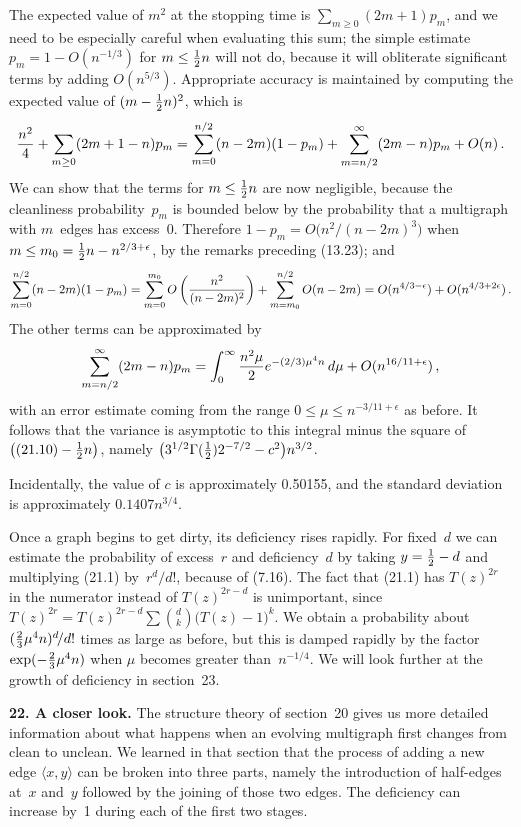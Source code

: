 The expected value of $m^2$ at the stopping time is $\sum_{m\geq
0}(2m+1)p_m$, 
and we need to be especially careful when evaluating this sum; the
simple estimate $p_m=1-O(n^{-1/3})$ for $m\leq {1\over2} n$ will not
do, because it will obliterate significant terms by adding
$O(n^{5/3})$. Appropriate accuracy is maintained by computing
the expected value of $(m-{1\over2} n)^2$, which is
$${n^2\over 4}+\sum_{m\geq
0}(2m+1-n)p_m=\sum_{m=0}^{n/2}(n-2m)(1-p_m)
+\sum_{m=n/2}^{\infty}(2m-n)p_m+O(n)\,.$$
We can show that the terms for $m\leq {1\over2} n$ are now negligible,
because the cleanliness probability~$p_m$ is bounded below by the
probability that a multigraph with $m$~edges has excess~0. Therefore
$1-p_m=O\bigl(n^2\!/(n-2m)^3\bigr)$ when $m\leq m_0={1\over
2}n-n^{2/3+\epsilon}$, by the remarks preceding (13.23); and
$$\sum_{m=0}^{n/2}(n-2m)(1-p_m)=\sum_{m=0}^{m_0}O\left({n^2\over
(n-2m)^2}\right)
+\sum_{m=m_0}^{n/2}O(n-2m)=O(n^{4/3-\epsilon})+O(n^{4/3+2\epsilon})\,.$$
The other terms can be approximated by
$$\sum_{m=n/2}^{\infty}(2m-n)p_m=
\int_0^{\infty}{n^2\mu\over2}e^{-(2/3)\mu^4n}\,d\mu+O(n^{16/11+\epsilon})\,,$$
with an error estimate coming from the range $0\leq \mu\leq
n^{-3/11+\epsilon}$ as before. It follows that the variance is
asymptotic to this integral minus the square of $\bigl((21.10)-{1\over
2}n\bigr)$, namely $\bigl(3^{1/2}\Gamma({1\over
2})2^{-7/2}-c^2\bigr)n^{3/2}$.

Incidentally, the value of $c$ is approximately 0.50155, and the
standard deviation is approximately $0.1407n^{3/4}$.\quad\pfbox

\medskip
Once a graph begins to get dirty, its deficiency rises rapidly. For
fixed~$d$ we can estimate the probability of excess~$r$ and
deficiency~$d$ by taking $y={1\over2} -d$ and multiplying (21.1)
by~$r^d\!/d!$, because of (7.16). The fact that (21.1) has $T(z)^{2r}$ in
the numerator instead of $T(z)^{2r-d}$ is unimportant, since
$T(z)^{2r}=T(z)^{2r-d}\sum{d\choose k}\bigl(T(z)-1\bigr)^k$. We obtain
a probability about $({2\over 3}\mu^4n)^d\!/d!$ times as large as before,
but this is damped rapidly by the factor $\exp(-{2\over 3}\mu^4n)$ when
$\mu$ becomes greater than~$n^{-1/4}$. We will look further at the
growth of deficiency in section~23.

\bigbreak\noindent
{\bf 22. A closer look.}\enspace
The structure theory of section~20 gives us more detailed information
about what happens when an evolving multigraph first changes from
clean to unclean. We learned in that section that the process of
adding a new edge $\langle x,y\rangle$ can be broken into three parts,
namely the introduction of half-edges at~$x$ and~$y$ followed by the
joining of those two edges. The deficiency can increase by~1 during
each of the first two stages. 

